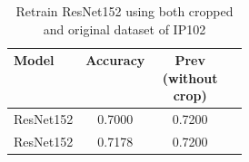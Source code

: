 \begin{table}[!htbp]
\centering
\begin{tabular}{|p{0.3\linewidth}|c|c|c|}
\hline
\textbf{Model} & \textbf{Accuracy} & \textbf{Prev (without crop)}\\
\hline
ResNet152 & 0.7000 & 0.7200\\
\hline
ResNet152 & 0.7178 & 0.7200\\
\hline
\end{tabular}
\caption{Retrain ResNet152 using both cropped and original dataset of IP102}
\end{table}

